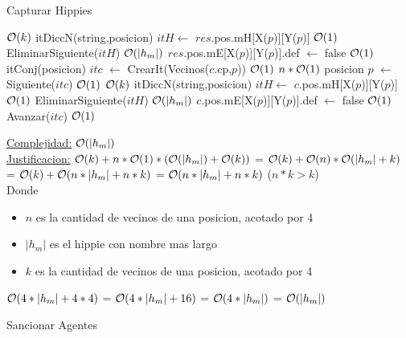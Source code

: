 \begin{Algoritmos}
\begin{algorithm}[H]
\caption{Capturar Hippies}
\begin{algorithmic}[1]
	 \Comment $\mathcal{O}(k)$
			\State itDiccN(string,posicion) $itH \gets$ $res$.pos.mH[X($p$)][Y($p$)] \Comment $\mathcal{O}(1)$
			\State EliminarSiguiente($itH$) \Comment $\mathcal{O}(|h_m|)$
			\State $res$.pos.mE[X($p$)][Y($p$)].def $\gets$ false \Comment $\mathcal{O}(1)$
	\Else
	\State itConj(posicion) $itc$ $\gets$ CrearIt(Vecinos($c$.cp,$p$)) \Comment $\mathcal{O}(1)$
	 \Comment $n*\mathcal{O}(1)$
		\State posicion $p$ $\gets$ Siguiente($itc$) \Comment $\mathcal{O}(1)$
		 \Comment $\mathcal{O}(k)$
			\State itDiccN(string,posicion) $itH \gets$ $c$.pos.mH[X($p$)][Y($p$)] \Comment $\mathcal{O}(1)$
			\State EliminarSiguiente($itH$) \Comment $\mathcal{O}(|h_m|)$
			\State $c$.pos.mE[X($p$)][Y($p$)].def $\gets$ false \Comment $\mathcal{O}(1)$
		\EndIf
		\State Avanzar($itc$) \Comment $\mathcal{O}(1)$
	\EndWhile
	
	\EndIf
	\EndProcedure
\end{algorithmic}
\underline{Complejidad:} $\mathcal{O}(|h_m|)$\\
\underline{Justificacion:} $\mathcal{O}(k) + n*\mathcal{O}(1)*(\mathcal{O}(|h_m|) + \mathcal{O}(k))$ = $\mathcal{O}(k) + \mathcal{O}(n)*\mathcal{O}(|h_m|+ k)$ = $\mathcal{O}(k) + \mathcal{O}(n*|h_m| + n*k)$ = $\mathcal{O}(n*|h_m| + n*k)$ ($n*k > k$)\\
Donde
\begin{itemize}
	\item $n$ es la cantidad de vecinos de una posicion, acotado por 4
	\item $|h_m|$ es el hippie con nombre mas largo
	\item $k$ es la cantidad de vecinos de una posicion, acotado por 4
\end{itemize}
$\mathcal{O}(4*|h_m| + 4*4)$ = $\mathcal{O}(4*|h_m| + 16)$ = $\mathcal{O}(4*|h_m|)$ = $\mathcal{O}(|h_m|)$
\end{algorithm}

\begin{algorithm}[H]
\caption{Sancionar Agentes}
\begin{algorithmic}[1]
	

\end{algorithmic}
\end{algorithm}
\end{Algoritmos}
